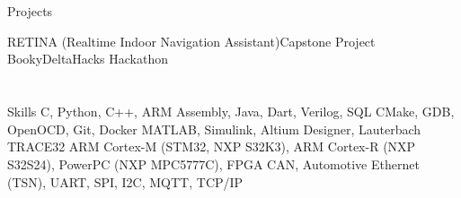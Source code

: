 \section{}{Projects\hspace{490pt}}

  \resumeEntryStart
    \resumeEntryTD
      {RETINA (Realtime Indoor Navigation Assistant)}{Capstone Project}
    \resumeItemListStart
    \resumeItemListEnd
  \resumeEntryEnd
  \resumeEntryStart
    \resumeEntryTD
      {Booky}{DeltaHacks Hackathon}
    \resumeItemListStart
    \resumeItemListEnd
  \resumeEntryEnd
\section{}{Skills\hspace{500pt}}
 \resumeEntryStart
   {C, Python, C++, ARM Assembly, Java, Dart, Verilog, SQL}
   {CMake, GDB, OpenOCD, Git, Docker}
   {MATLAB, Simulink, Altium Designer, Lauterbach TRACE32}
   {ARM Cortex-M (STM32, NXP S32K3), ARM Cortex-R (NXP S32S24), PowerPC (NXP MPC5777C), FPGA}
   {CAN, Automotive Ethernet (TSN), UART, SPI, I2C, MQTT, TCP/IP}
 \resumeEntryEnd
